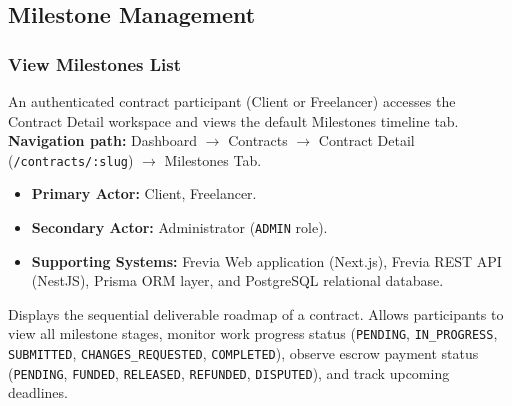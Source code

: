 
\subsection{Milestone Management}

\subsubsection{ View Milestones List}

An authenticated contract participant (Client or Freelancer) accesses the Contract Detail workspace and views the default Milestones timeline tab.\newline
\textbf{Navigation path:} Dashboard $\rightarrow$ Contracts $\rightarrow$ Contract Detail (\texttt{/\allowbreak{}contracts/\allowbreak{}:\allowbreak{}slug}) $\rightarrow$ Milestones Tab.


\begin{itemize}[leftmargin=1.6em,topsep=3pt,itemsep=2pt,parsep=0pt,label=$\bullet$]
      \item \textbf{Primary Actor:} Client, Freelancer.
      \item \textbf{Secondary Actor:} Administrator (\texttt{ADMIN} role).
      \item \textbf{Supporting Systems:} Frevia Web application (Next.js), Frevia REST API (NestJS), Prisma ORM layer, and PostgreSQL relational database.
\end{itemize}

\noindent Displays the sequential deliverable roadmap of a contract. Allows participants to view all milestone stages, monitor work progress status (\texttt{PENDING}, \texttt{IN\_PROGRESS}, \texttt{SUBMITTED}, \texttt{CHANGES\_REQUESTED}, \texttt{COMPLETED}), observe escrow payment status (\texttt{PENDING}, \texttt{FUNDED}, \texttt{RELEASED}, \texttt{REFUNDED}, \texttt{DISPUTED}), and track upcoming deadlines.

